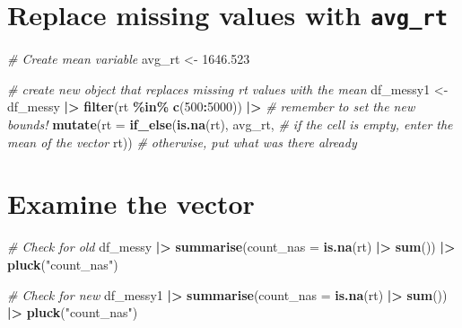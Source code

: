 \documentclass[
]{article}
\newenvironment{Shaded}{\begin{snugshade}}{\end{snugshade}}
\newcommand{\AttributeTok}[1]{\textcolor[rgb]{0.13,0.29,0.53}{#1}}
\newcommand{\CommentTok}[1]{\textcolor[rgb]{0.56,0.35,0.01}{\textit{#1}}}
\newcommand{\DecValTok}[1]{\textcolor[rgb]{0.00,0.00,0.81}{#1}}
\newcommand{\FloatTok}[1]{\textcolor[rgb]{0.00,0.00,0.81}{#1}}
\newcommand{\FunctionTok}[1]{\textcolor[rgb]{0.13,0.29,0.53}{\textbf{#1}}}
\newcommand{\NormalTok}[1]{#1}
\newcommand{\OtherTok}[1]{\textcolor[rgb]{0.56,0.35,0.01}{#1}}
\newcommand{\SpecialCharTok}[1]{\textcolor[rgb]{0.81,0.36,0.00}{\textbf{#1}}}
\newcommand{\StringTok}[1]{\textcolor[rgb]{0.31,0.60,0.02}{#1}}
\begin{document}
\hypertarget{replace-missing-values-with-avg_rt}{%
\section{\texorpdfstring{Replace missing values with
\texttt{avg\_rt}}{Replace missing values with avg\_rt}}\label{replace-missing-values-with-avg_rt}}

\begin{Shaded}
\begin{Highlighting}[]
\CommentTok{\# Create mean variable}
\NormalTok{avg\_rt }\OtherTok{\textless{}{-}} \FloatTok{1646.523}

\CommentTok{\# create new object that replaces missing rt values with the mean}
\NormalTok{df\_messy1 }\OtherTok{\textless{}{-}}
\NormalTok{  df\_messy }\SpecialCharTok{|\textgreater{}}
  \FunctionTok{filter}\NormalTok{(rt }\SpecialCharTok{\%in\%} \FunctionTok{c}\NormalTok{(}\DecValTok{500}\SpecialCharTok{:}\DecValTok{5000}\NormalTok{)) }\SpecialCharTok{|\textgreater{}}              \CommentTok{\# remember to set the new bounds!}
  \FunctionTok{mutate}\NormalTok{(}\AttributeTok{rt =} \FunctionTok{if\_else}\NormalTok{(}\FunctionTok{is.na}\NormalTok{(rt), }
\NormalTok{                      avg\_rt, }\CommentTok{\# if the cell is empty, enter the mean of the vector}
\NormalTok{                      rt))                     }\CommentTok{\# otherwise, put what was there already }
\end{Highlighting}
\end{Shaded}

\hypertarget{examine-the-vector}{%
\section{Examine the vector}\label{examine-the-vector}}

\begin{Shaded}
\begin{Highlighting}[]
\CommentTok{\# Check for old}
\NormalTok{df\_messy }\SpecialCharTok{|\textgreater{}}
  \FunctionTok{summarise}\NormalTok{(}\AttributeTok{count\_nas =} \FunctionTok{is.na}\NormalTok{(rt) }\SpecialCharTok{|\textgreater{}}
              \FunctionTok{sum}\NormalTok{()) }\SpecialCharTok{|\textgreater{}}
  \FunctionTok{pluck}\NormalTok{(}\StringTok{"count\_nas"}\NormalTok{)}

\CommentTok{\# Check for new}
\NormalTok{df\_messy1 }\SpecialCharTok{|\textgreater{}}
  \FunctionTok{summarise}\NormalTok{(}\AttributeTok{count\_nas =} \FunctionTok{is.na}\NormalTok{(rt) }\SpecialCharTok{|\textgreater{}}
              \FunctionTok{sum}\NormalTok{()) }\SpecialCharTok{|\textgreater{}}
  \FunctionTok{pluck}\NormalTok{(}\StringTok{"count\_nas"}\NormalTok{)}
\end{Highlighting}
\end{Shaded}
\end{document}
